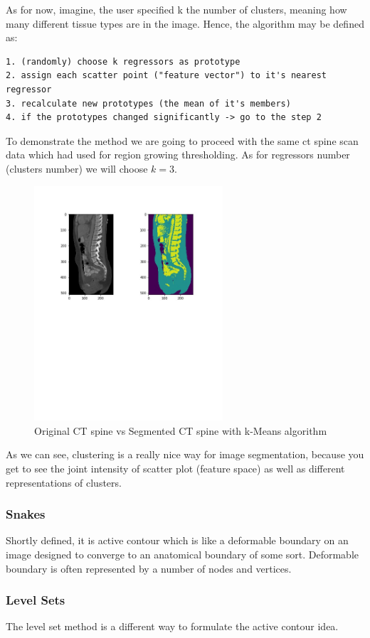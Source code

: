 As for now, imagine, the user specified k the number of clusters, meaning how many different tissue types are in the image.
Hence, the algorithm may be defined as:
\begin{lstlisting}
1. (randomly) choose k regressors as prototype
2. assign each scatter point ("feature vector") to it's nearest regressor
3. recalculate new prototypes (the mean of it's members)
4. if the prototypes changed significantly -> go to the step 2 
\end{lstlisting}
To demonstrate the method we are going to proceed with the same ct spine scan data which had used for region growing thresholding. As for regressors number (clusters number) we will choose $k=3$.  

\newpage
\begin{figure}[h]
    \centering \includegraphics[width=7cm]{images/ct-spine-k-means-segmented.jpg}
    \vspace*{-40mm} \caption {Original CT spine vs Segmented CT spine with k-Means algorithm}
\end{figure}    

As we can see, clustering is a really nice way for image segmentation, because you get to see the joint intensity of scatter plot (feature space) as well as different representations of clusters.  

\subsubsection{Snakes}
Shortly defined, it is active contour which is like a deformable boundary on an image designed to converge to an anatomical boundary of some sort. Deformable boundary is often represented by a number of nodes and vertices.  

\subsubsection{Level Sets}
The level set method is a different way to formulate the active contour idea. %

